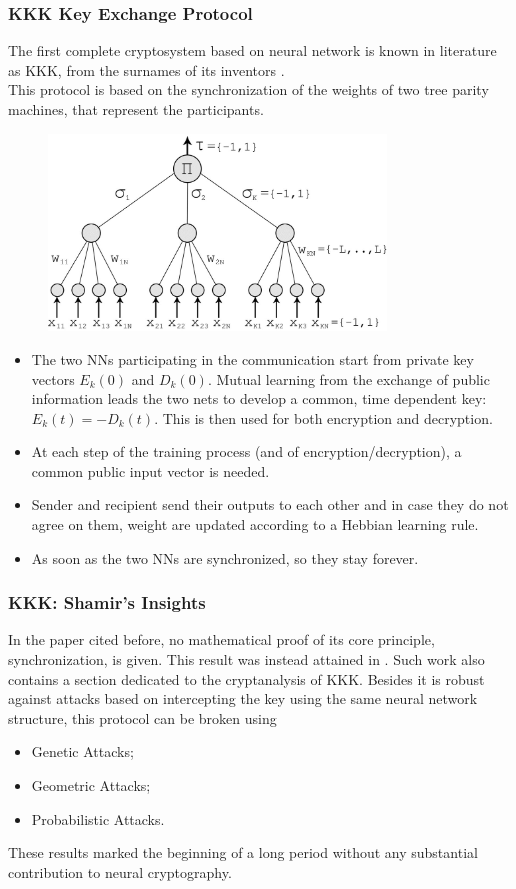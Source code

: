 \documentclass{beamer}
\begin{document}
\begin{frame}
\frametitle{KKK Key Exchange Protocol}
The first complete cryptosystem based on neural network is known in literature as KKK, from the surnames of its inventors \cite{kanter}. \\
This protocol is based on the synchronization of the weights of two tree parity machines, that represent the participants.
\begin{figure}
\includegraphics[width = 0.8\textwidth]{"pictures/tpm.jpg"}
\end{figure}
\end{frame}
\begin{frame}
\begin{itemize}
\item The two NNs participating in the communication start from private key vectors $E_k(0)$ and $D_k(0)$. Mutual learning from the exchange of public information leads the two nets to develop a common, time dependent key: $E_k(t) = - D_k(t)$. This is then used for both encryption and decryption.
\item At each step of the training process (and of encryption/decryption), a common public input vector is needed. 
\item Sender and recipient send their outputs to each other and in case they do not agree on them, weight are updated according
to a Hebbian learning rule.
\item As soon as the two NNs are synchronized, so they stay forever.
\end{itemize}
\end{frame}

\begin{frame}
\frametitle{KKK: Shamir's Insights}
In the paper cited before, no mathematical proof of its core principle, synchronization, is given. This result was instead attained in \cite{shamir}. Such work also contains a section dedicated to the cryptanalysis of KKK. Besides it is robust against attacks based on intercepting the key using the same neural network structure, this protocol can be broken using
\begin{itemize}
\item Genetic Attacks;
\item Geometric Attacks;
\item Probabilistic Attacks.
\end{itemize}
These results marked the beginning of a long period without any substantial contribution to neural cryptography.
\end{frame}
\end{document}
